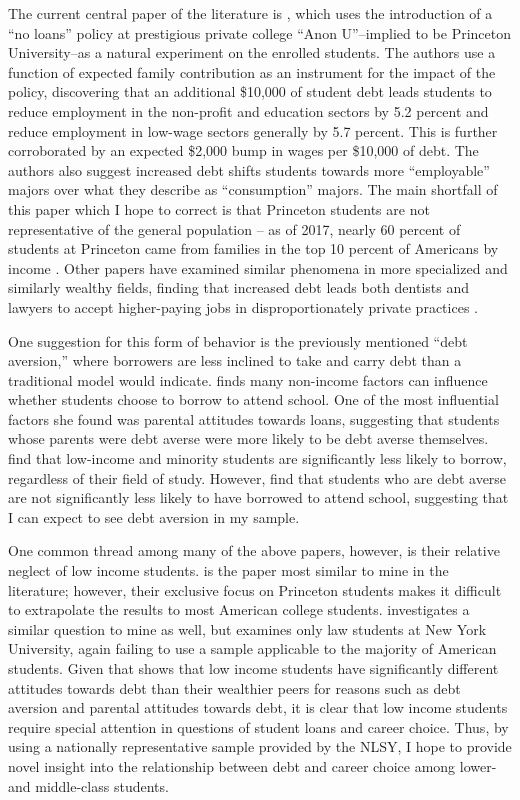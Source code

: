 \documentclass[12pt]{article}
\begin{document}
	The current central paper of the literature is \textcite{rothstein2011}, which uses the introduction of a ``no loans'' policy at prestigious private college ``Anon U''--implied to be Princeton University--as a natural experiment on the enrolled students. The authors use a function of expected family contribution as an instrument for the impact of the policy, discovering that an additional \$10,000 of student debt leads students to reduce employment in the non-profit and education sectors by 5.2 percent and reduce employment in low-wage sectors generally by 5.7 percent. This is further corroborated by an expected \$2,000 bump in wages per \$10,000 of debt. The authors also suggest increased debt shifts students towards more ``employable'' majors over what they describe as ``consumption'' majors. The main shortfall of this paper which I hope to correct is that Princeton students are not representative of the general population -- as of 2017, nearly 60 percent of students at Princeton came from families in the top 10 percent of Americans by income \parencite{aisch2017}. Other papers have examined similar phenomena in more specialized and similarly wealthy fields, finding that increased debt leads both dentists and lawyers to accept higher-paying jobs in disproportionately private practices \parencite{nicholson2015, field2009}.
	
	One suggestion for this form of behavior is the previously mentioned ``debt aversion,'' where borrowers are less inclined to take and carry debt than a traditional model would indicate. \textcite{burdman2005} finds many non-income factors can influence whether students choose to borrow to attend school. One of the most influential factors she found was parental attitudes towards loans, suggesting that students whose parents were debt averse were more likely to be debt averse themselves. \textcite{callender2005} find that low-income and minority students are significantly less likely to borrow, regardless of their field of study. However, \textcite{eckel2007} find that students who are debt averse are not significantly less likely to have borrowed to attend school, suggesting that I can expect to see debt aversion in my sample. 
	
	One common thread among many of the above papers, however, is their relative neglect of low income students. \textcite{rothstein2011} is the paper most similar to mine in the literature; however, their exclusive focus on Princeton students makes it difficult to extrapolate the results to most American college students. \textcite{field2009} investigates a similar question to mine as well, but examines only law students at New York University, again failing to use a sample applicable to the majority of American students. Given that \textcite{callender2005} shows that low income students have significantly different attitudes towards debt than their wealthier peers for reasons such as debt aversion and parental attitudes towards debt, it is clear that low income students require special attention in questions of student loans and career choice. Thus, by using a nationally representative sample provided by the NLSY, I hope to provide novel insight into the relationship between debt and career choice among lower- and middle-class students.
\end{document}

